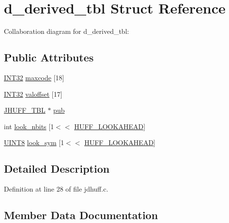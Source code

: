 \hypertarget{structd__derived__tbl}{}\section{d\+\_\+derived\+\_\+tbl Struct Reference}
\label{structd__derived__tbl}


Collaboration diagram for d\+\_\+derived\+\_\+tbl\+:
\subsection*{Public Attributes}
\begin{DoxyCompactItemize}
\item 
\mbox{\hyperlink{jmorecfg_8h_a0cb58e7e6f0bad369840a52e54a56ae0}{I\+N\+T32}} \mbox{\hyperlink{structd__derived__tbl_a4e226d20d913f1c516bd98a930008ad1}{maxcode}} \mbox{[}18\mbox{]}
\item 
\mbox{\hyperlink{jmorecfg_8h_a0cb58e7e6f0bad369840a52e54a56ae0}{I\+N\+T32}} \mbox{\hyperlink{structd__derived__tbl_a67397b3869145321a25d2df17a0c11ec}{valoffset}} \mbox{[}17\mbox{]}
\item 
\mbox{\hyperlink{structJHUFF__TBL}{J\+H\+U\+F\+F\+\_\+\+T\+BL}} $\ast$ \mbox{\hyperlink{structd__derived__tbl_a816f4c07d3173cd1a96ef146acabf6c6}{pub}}
\item 
int \mbox{\hyperlink{structd__derived__tbl_a69e9228ebe44420f896c147bcb8b2f4b}{look\+\_\+nbits}} \mbox{[}1$<$$<$ \mbox{\hyperlink{jdhuff_8c_a51937b71b3fbef28d57cc49f69ec8e7d}{H\+U\+F\+F\+\_\+\+L\+O\+O\+K\+A\+H\+E\+AD}}\mbox{]}
\item 
\mbox{\hyperlink{jmorecfg_8h_adfb9a8ea1dd59f151065f763e1e9acd6}{U\+I\+N\+T8}} \mbox{\hyperlink{structd__derived__tbl_a526051256461864bc8395d1f6d1a82fd}{look\+\_\+sym}} \mbox{[}1$<$$<$ \mbox{\hyperlink{jdhuff_8c_a51937b71b3fbef28d57cc49f69ec8e7d}{H\+U\+F\+F\+\_\+\+L\+O\+O\+K\+A\+H\+E\+AD}}\mbox{]}
\end{DoxyCompactItemize}


\subsection{Detailed Description}


Definition at line 28 of file jdhuff.\+c.



\subsection{Member Data Documentation}
\mbox{\label{structd__derived__tbl_a69e9228ebe44420f896c147bcb8b2f4b}} 
